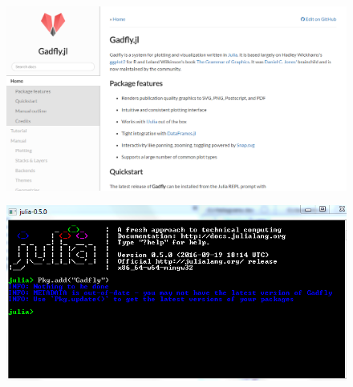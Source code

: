 \documentclass[Master.tex]{subfiles}
\begin{document}
\begin{frame}
\begin{figure}
\centering
\includegraphics[width=0.7\linewidth]{images/gadflywebsite}
\caption{}
\label{fig:gadflywebsite}
\end{figure}

\end{frame}



\begin{frame}
	\begin{figure}
\centering
\includegraphics[width=0.7\linewidth]{images/InstallGadfly}
\caption{}
\label{fig:InstallGadfly}
\end{figure}

	
\end{frame}

	
	
\end{document}

